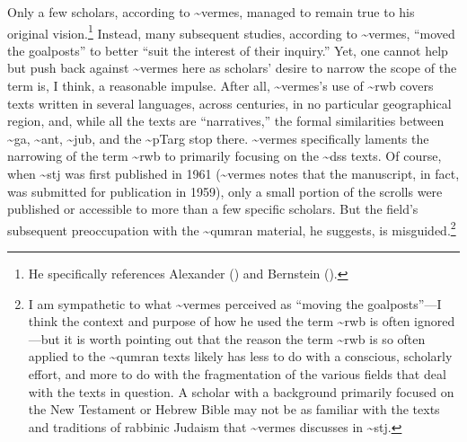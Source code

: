 Only a few scholars, according to \textasciitilde{}vermes, managed to
remain true to his original vision.\footnote{He specifically references
  Alexander (\autocite*{alexander_carson-williamson1988}) and Bernstein
  (\autocite*{bernstein_textus2005}).} Instead, many subsequent studies,
according to \textasciitilde{}vermes, ``moved the goalposts'' to better
``suit the interest of their
inquiry.''\autocite[4]{vermes_zsengeller2014} Yet, one cannot help but
push back against \textasciitilde{}vermes here as scholars' desire to
narrow the scope of the term is, I think, a reasonable impulse. After
all, \textasciitilde{}vermes's use of \textasciitilde{}rwb covers texts
written in several languages, across centuries, in no particular
geographical region, and, while all the texts are ``narratives,'' the
formal similarities between \textasciitilde{}ga, \textasciitilde{}ant,
\textasciitilde{}jub, and the \textasciitilde{}pTarg stop there.
\textasciitilde{}vermes specifically laments the narrowing of the term
\textasciitilde{}rwb to primarily focusing on the \textasciitilde{}dss
texts. Of course, when \textasciitilde{}stj was first published in 1961
(\textasciitilde{}vermes notes that the manuscript, in fact, was
submitted for publication in 1959), only a small portion of the scrolls
were published or accessible to more than a few specific scholars. But
the field's subsequent preoccupation with the \textasciitilde{}qumran
material, he suggests, is misguided.\footnote{I am sympathetic to what
  \textasciitilde{}vermes perceived as ``moving the goalposts''---I
  think the context and purpose of how he used the term
  \textasciitilde{}rwb is often ignored---but it is worth pointing out
  that the reason the term \textasciitilde{}rwb is so often applied to
  the \textasciitilde{}qumran texts likely has less to do with a
  conscious, scholarly effort, and more to do with the fragmentation of
  the various fields that deal with the texts in question. A scholar
  with a background primarily focused on the New Testament or Hebrew
  Bible may not be as familiar with the texts and traditions of rabbinic
  Judaism that \textasciitilde{}vermes discusses in
  \textasciitilde{}stj.}

